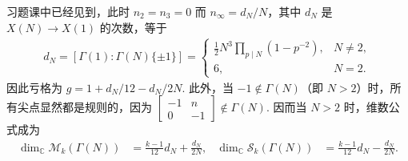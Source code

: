 \begin{example*}
习题课中已经见到，此时 $n_2=n_3=0$ 而 $n_\infty=d_N/N$，其中 $d_N$ 是 $X(N)\to X(1)$ 的次数，等于
\begin{align*}
d_N=[\Gamma(1):\Gamma(N)\{\pm1\}]=\begin{cases}\frac12N^3\prod_{p\mid N}(1-p^{-2}),&N\ne2,\\6,&N=2.\end{cases}
\end{align*}
因此亏格为 $g=1+d_N/12-d_N/2N$. 此外，当 $-1\notin\Gamma(N)$（即 $N>2$）时，所有尖点显然都是规则的，因为 $\left[\begin{smallmatrix}-1&n\\0&-1\end{smallmatrix}\right]\notin\Gamma(N)$. 因而当 $N>2$ 时，维数公式成为
\begin{align*}
\dim_{\mathbb C}\mathcal M_k(\Gamma(N))&=\frac{k-1}{12}d_N+\frac{d_N}{2N},&
\dim_{\mathbb C}\mathcal S_k(\Gamma(N))&=\frac{k-1}{12}d_N-\frac{d_N}{2N}.
\end{align*}
\end{example*}

